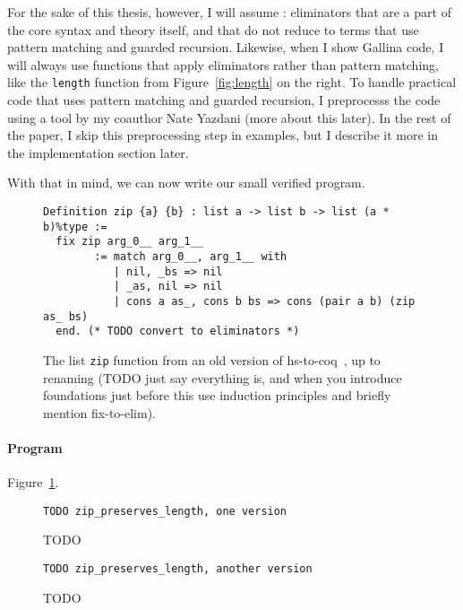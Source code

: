 For the sake of this thesis, however, I will assume : eliminators that are a part of the core syntax and theory itself,
and that do not reduce to terms that use pattern matching and guarded recursion.
Likewise, when I show Gallina code, I will always use functions that apply eliminators rather than pattern matching, like the \lstinline{length} function from Figure~\ref{fig:length}
on the right.
To handle practical code that uses pattern matching and guarded recursion,
I preprocesss the code using a tool by my coauthor Nate Yazdani (more about this later). %
In the rest of the paper, I skip this preprocessing step in examples, but I describe it more in the implementation section later.

With that in mind, we can now write our small verified program.

\begin{figure}
\begin{lstlisting}
Definition zip {a} {b} : list a -> list b -> list (a * b)%type :=
  fix zip arg_0__ arg_1__
        := match arg_0__, arg_1__ with
           | nil, _bs => nil
           | _as, nil => nil
           | cons a as_, cons b bs => cons (pair a b) (zip as_ bs)
  end. (* TODO convert to eliminators *)
\end{lstlisting}
\caption{The list \lstinline{zip} function from an old version of hs-to-coq~\cite{TODO}, up to renaming (TODO just say everything is, and when you introduce foundations just before this use induction principles and briefly mention fix-to-elim).}
\label{fig:zip}
\end{figure}

\paragraph{Program} Figure~\ref{fig:zip}.

\begin{figure}
\begin{lstlisting}
TODO zip_preserves_length, one version
\end{lstlisting}
\caption{TODO}
\label{fig:zip-pres}
\end{figure}

\begin{figure}
\begin{lstlisting}
TODO zip_preserves_length, another version
\end{lstlisting}
\caption{TODO}
\label{fig:zip-pres-alt}
\end{figure}


